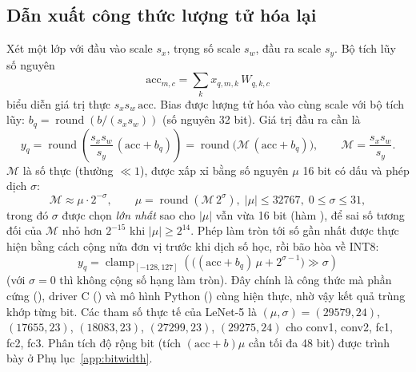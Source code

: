 \subsection{Dẫn xuất công thức lượng tử hóa lại}
\label{sec:requant}
Xét một lớp với đầu vào scale $s_x$, trọng số scale $s_w$, đầu ra scale $s_y$. Bộ tích lũy số nguyên
\begin{equation}
  \mathrm{acc}_{m,c} = \sum_k x_{q,m,k}\,W_{q,k,c}
\end{equation}
biểu diễn giá trị thực $s_x s_w\,\mathrm{acc}$. Bias được lượng tử hóa vào cùng scale với bộ tích lũy: $b_q=\operatorname{round}(b/(s_xs_w))$ (số nguyên 32 bit). Giá trị đầu ra cần là
\begin{equation}
  y_q = \operatorname{round}\!\left(\frac{s_x s_w}{s_y}\,(\mathrm{acc}+b_q)\right) = \operatorname{round}\big(\mathcal{M}\,(\mathrm{acc}+b_q)\big),\qquad \mathcal{M}=\frac{s_xs_w}{s_y}.
\end{equation}
$\mathcal{M}$ là số thực (thường $\ll1$), được xấp xỉ bằng số nguyên $\mu$ 16 bit có dấu và phép dịch $\sigma$:
\begin{equation}
  \mathcal{M}\approx \mu\cdot 2^{-\sigma},\qquad \mu=\operatorname{round}(\mathcal{M}\,2^{\sigma}),\; |\mu|\le 32767,\; 0\le\sigma\le31,
\end{equation}
trong đó $\sigma$ được chọn \emph{lớn nhất} sao cho $|\mu|$ vẫn vừa 16 bit (hàm ), để sai số tương đối của $\mathcal{M}$ nhỏ hơn $2^{-15}$ khi $|\mu|\ge 2^{14}$. Phép làm tròn tới số gần nhất được thực hiện bằng cách cộng nửa đơn vị trước khi dịch số học, rồi bão hòa về INT8:
\begin{equation}
  \boxed{\,y_q = \operatorname{clamp}_{[-128,127]}\!\left( \Big( (\mathrm{acc}+b_q)\,\mu + 2^{\sigma-1}\Big) \gg \sigma \right)\,}
  \label{eq:requant}
\end{equation}
(với $\sigma=0$ thì không cộng số hạng làm tròn). Đây chính là công thức mà phần cứng (), driver C () và mô hình Python () cùng hiện thực, nhờ vậy kết quả trùng khớp từng bit. Các tham số thực tế của LeNet-5 là $(\mu,\sigma)=(29579,24)$, $(17655,23)$, $(18083,23)$, $(27299,23)$, $(29275,24)$ cho conv1, conv2, fc1, fc2, fc3. Phân tích độ rộng bit (tích $(\mathrm{acc}+b)\mu$ cần tối đa 48 bit) được trình bày ở Phụ lục~\ref{app:bitwidth}.

